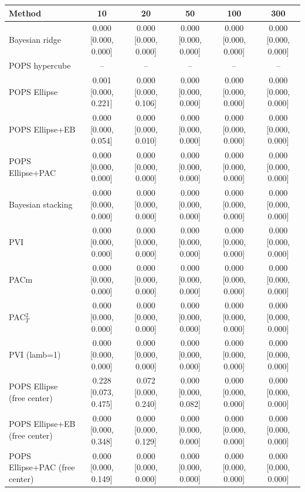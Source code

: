 \begin{tabular}{lccccc}
\toprule
Method & 10 & 20 & 50 & 100 & 300 \\
\midrule
Bayesian ridge & 0.000 {\scriptsize[0.000, 0.000]} & 0.000 {\scriptsize[0.000, 0.000]} & 0.000 {\scriptsize[0.000, 0.000]} & 0.000 {\scriptsize[0.000, 0.000]} & 0.000 {\scriptsize[0.000, 0.000]} \\
POPS hypercube & -- & -- & -- & -- & -- \\
POPS Ellipse & 0.001 {\scriptsize[0.000, 0.221]} & 0.000 {\scriptsize[0.000, 0.106]} & 0.000 {\scriptsize[0.000, 0.000]} & 0.000 {\scriptsize[0.000, 0.000]} & 0.000 {\scriptsize[0.000, 0.000]} \\
POPS Ellipse+EB & 0.000 {\scriptsize[0.000, 0.054]} & 0.000 {\scriptsize[0.000, 0.010]} & 0.000 {\scriptsize[0.000, 0.000]} & 0.000 {\scriptsize[0.000, 0.000]} & 0.000 {\scriptsize[0.000, 0.000]} \\
POPS Ellipse+PAC & 0.000 {\scriptsize[0.000, 0.000]} & 0.000 {\scriptsize[0.000, 0.000]} & 0.000 {\scriptsize[0.000, 0.000]} & 0.000 {\scriptsize[0.000, 0.000]} & 0.000 {\scriptsize[0.000, 0.000]} \\
Bayesian stacking & 0.000 {\scriptsize[0.000, 0.000]} & 0.000 {\scriptsize[0.000, 0.000]} & 0.000 {\scriptsize[0.000, 0.000]} & 0.000 {\scriptsize[0.000, 0.000]} & 0.000 {\scriptsize[0.000, 0.000]} \\
PVI & 0.000 {\scriptsize[0.000, 0.000]} & 0.000 {\scriptsize[0.000, 0.000]} & 0.000 {\scriptsize[0.000, 0.000]} & 0.000 {\scriptsize[0.000, 0.000]} & 0.000 {\scriptsize[0.000, 0.000]} \\
PACm & 0.000 {\scriptsize[0.000, 0.000]} & 0.000 {\scriptsize[0.000, 0.000]} & 0.000 {\scriptsize[0.000, 0.000]} & 0.000 {\scriptsize[0.000, 0.000]} & 0.000 {\scriptsize[0.000, 0.000]} \\
PAC$^2_T$ & 0.000 {\scriptsize[0.000, 0.000]} & 0.000 {\scriptsize[0.000, 0.000]} & 0.000 {\scriptsize[0.000, 0.000]} & 0.000 {\scriptsize[0.000, 0.000]} & 0.000 {\scriptsize[0.000, 0.000]} \\
PVI (lamb=1) & 0.000 {\scriptsize[0.000, 0.000]} & 0.000 {\scriptsize[0.000, 0.000]} & 0.000 {\scriptsize[0.000, 0.000]} & 0.000 {\scriptsize[0.000, 0.000]} & 0.000 {\scriptsize[0.000, 0.000]} \\
POPS Ellipse (free center) & 0.228 {\scriptsize[0.073, 0.475]} & 0.072 {\scriptsize[0.000, 0.240]} & 0.000 {\scriptsize[0.000, 0.082]} & 0.000 {\scriptsize[0.000, 0.000]} & 0.000 {\scriptsize[0.000, 0.000]} \\
POPS Ellipse+EB (free center) & 0.000 {\scriptsize[0.000, 0.348]} & 0.000 {\scriptsize[0.000, 0.129]} & 0.000 {\scriptsize[0.000, 0.000]} & 0.000 {\scriptsize[0.000, 0.000]} & 0.000 {\scriptsize[0.000, 0.000]} \\
POPS Ellipse+PAC (free center) & 0.000 {\scriptsize[0.000, 0.149]} & 0.000 {\scriptsize[0.000, 0.000]} & 0.000 {\scriptsize[0.000, 0.000]} & 0.000 {\scriptsize[0.000, 0.000]} & 0.000 {\scriptsize[0.000, 0.000]} \\
\bottomrule
\end{tabular}

